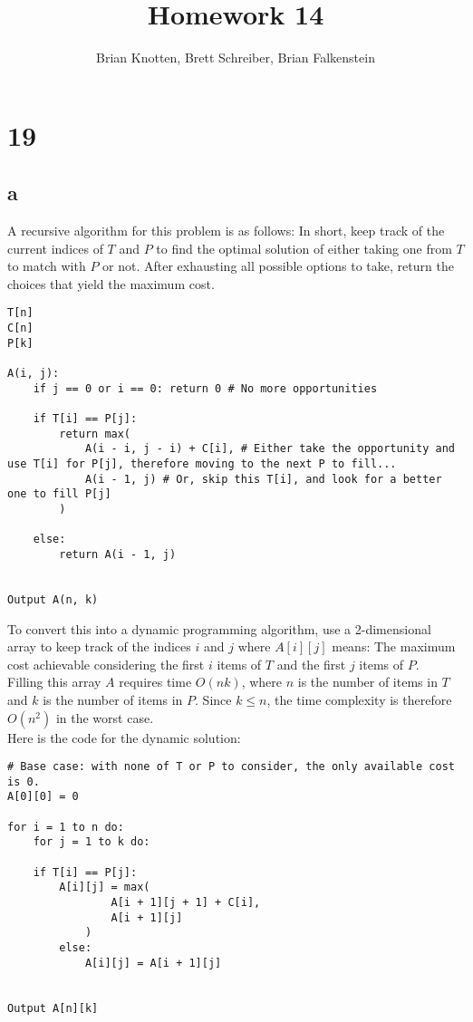 \documentclass[letterpaper,notitlepage,twoside]{article}
\begin{document}
\title{Homework 14}
\author{Brian Knotten, Brett Schreiber, Brian Falkenstein}
\maketitle

\section*{19}
\subsection*{a}
A recursive algorithm for this problem is as follows:
In short, keep track of the current indices of $T$ and $P$ to find the optimal solution of either taking one from $T$ to match with $P$ or not. After exhausting all possible options to take, return the choices that yield the maximum cost. 
\begin{verbatim}
T[n]
C[n]
P[k]

A(i, j):
    if j == 0 or i == 0: return 0 # No more opportunities

    if T[i] == P[j]:
        return max(
            A(i - i, j - i) + C[i], # Either take the opportunity and use T[i] for P[j], therefore moving to the next P to fill...
            A(i - 1, j) # Or, skip this T[i], and look for a better one to fill P[j]
        )
		
    else:
        return A(i - 1, j)
	

Output A(n, k)
\end{verbatim}

To convert this into a dynamic programming algorithm, use a 2-dimensional array to keep track of the indices $i$ and $j$ where $A[i][j]$ means: The maximum cost achievable considering the first $i$ items of $T$ and the first $j$ items of $P$. \\

Filling this array $A$ requires time $O(nk)$, where $n$ is the number of items in $T$ and $k$ is the number of items in $P$. Since $k \leq n$, the time complexity is therefore $O(n^2)$ in the worst case. \\

Here is the code for the dynamic solution:
\begin{verbatim}
# Base case: with none of T or P to consider, the only available cost is 0.
A[0][0] = 0

for i = 1 to n do:
    for j = 1 to k do:
        
	if T[i] == P[j]:
	    A[i][j] = max(
                A[i + 1][j + 1] + C[i],
                A[i + 1][j]
            )
        else:
            A[i][j] = A[i + 1][j]


Output A[n][k]
\end{verbatim}
\end{document}
